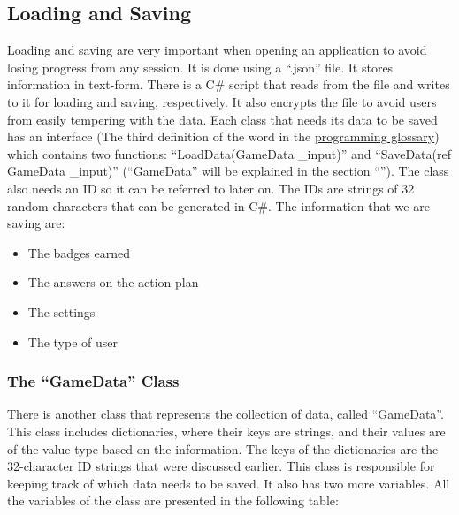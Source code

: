 \subsection{Loading and Saving}
\label{LoadingAndSaving}

Loading and saving are very important when opening an application to avoid losing progress from any session. It is done using a “.json” file. It stores information in text-form. There is a C\# script that reads from the file and writes to it for loading and saving, respectively. It also encrypts the file to avoid users from easily tempering with the data. Each class that needs its data to be saved has an interface (The third definition of the word in the \hyperref[ProgDefinitionsSec]{programming glossary}) which contains two functions: “{\codefont LoadData(GameData \_input)}” and “{\codefont SaveData(ref GameData \_input)}” (“{\codefont GameData}” will be explained in the section “\textbf{}”). The class also needs an ID so it can be referred to later on. The IDs are strings of 32 random characters that can be generated in C\#. The information that we are saving are:
\begin{itemize}
    \item{The badges earned}
    
    \item{The answers on the action plan}
    
    \item{The settings}
    
    \item{The type of user}
\end{itemize}
\subsubsection*{The “{\codefont GameData}” Class}
\label{GameDataClassSection}
There is another class that represents the collection of data, called “{\codefont GameData}”. This class includes dictionaries, where their keys are strings, and their values are of the value type based on the information. The keys of the dictionaries are the 32-character ID strings that were discussed earlier. This class is responsible for keeping track of which data needs to be saved. It also has two more variables. All the variables of the class are presented in the following table:

